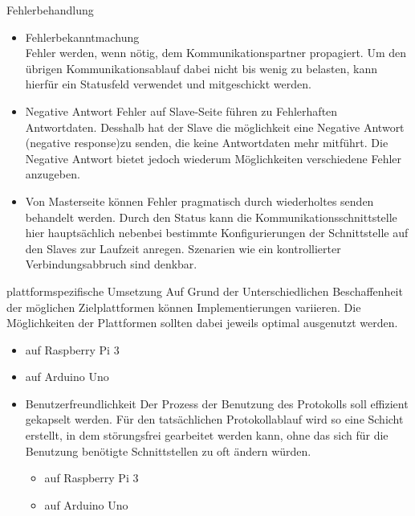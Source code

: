 
	\item [A07] Fehlerbehandlung\\
		\begin{itemize}
			\item [A07.1] Fehlerbekanntmachung\\
				Fehler werden, wenn nötig, dem Kommunikationspartner propagiert. Um den übrigen Kommunikationsablauf dabei nicht bis wenig zu belasten, kann hierfür ein Statusfeld verwendet und mitgeschickt werden.
			\item [A07.2]Negative Antwort
				Fehler auf Slave-Seite führen zu Fehlerhaften Antwortdaten. Desshalb hat der Slave die möglichkeit eine Negative Antwort (negative response)zu senden, die keine Antwortdaten mehr mitführt. Die Negative Antwort bietet jedoch wiederum Möglichkeiten verschiedene Fehler anzugeben.\par
			\item [A07.3] Von Masterseite können Fehler pragmatisch durch wiederholtes senden behandelt werden. Durch den Status kann die Kommunikationsschnittstelle hier hauptsächlich nebenbei bestimmte Konfigurierungen der Schnittstelle auf den Slaves zur Laufzeit anregen. Szenarien wie ein kontrollierter Verbindungsabbruch sind denkbar.\par
		\end{itemize}
	
	\item [A08] plattformspezifische Umsetzung
		Auf Grund der Unterschiedlichen Beschaffenheit der möglichen Zielplattformen können Implementierungen variieren. Die Möglichkeiten der Plattformen sollten dabei jeweils optimal ausgenutzt werden.
		\begin{itemize}
			\item [A08.1] auf Raspberry Pi 3
			\item [A08.2] auf Arduino Uno

	\item [A09] Benutzerfreundlichkeit
		Der Prozess der Benutzung des Protokolls soll effizient gekapselt werden. Für den tatsächlichen Protokollablauf wird so eine Schicht erstellt, in dem störungsfrei gearbeitet werden kann, ohne das sich für die Benutzung benötigte Schnittstellen zu oft ändern würden.
		\begin{itemize}
			\item [A09.1] auf Raspberry Pi 3
			\item [A09.2] auf Arduino Uno
		\end{itemize}
\end{itemize}
